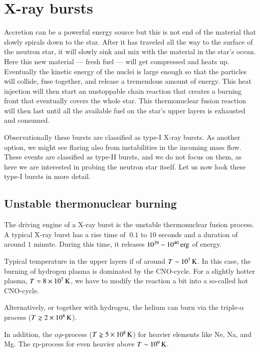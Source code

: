 \section{X-ray bursts}

Accretion can be a powerful energy source but this is not end of the material that slowly spirals down to the star.
After it has traveled all the way to the surface of the neutron star, it will slowly sink and mix with the material in the star's ocean.
Here this new material --- fresh fuel --- will get compressed and heats up.
Eventually the kinetic energy of the nuclei is large enough so that the particles will collide, fuse together, and release a tremendous amount of energy.
This heat injection will then start an unstoppable chain reaction that creates a burning front that eventually covers the whole star.
This thermonuclear fusion reaction will then last until all the available fuel on the star's upper layers is exhausted and consumed.

Observationally these bursts are classified as type-I X-ray bursts.
As another option, we might see flaring also from instabilities in the incoming mass flow. 
These events are classified as type-II bursts, and we do not focus on them, as here we are interested in probing the neutron star itself.
Let us now look these type-I bursts in more detail.



\subsection{Unstable thermonuclear burning}

The driving engine of a X-ray burst is the unstable thermonuclear fusion process.
A typical X-ray burst has a rise time of $~0.1$ to $10$ seconds and a duration of around $1$ minute.
During this time, it releases $10^{39} - 10^{40} \, \mathrm{erg}$ of energy.

\cite{Lewin93}
\cite{SB10}

Typical temperature in the upper layers if of around $T \sim 10^7 \, \mathrm{K}$.
In this case, the burning of hydrogen plasma is dominated by the CNO-cycle.
For a slightly hotter plasma, $T \approx 8 \times 10^{7} \, \mathrm{K}$, we have to modify the reaction a bit into a so-called hot CNO-cycle.\cite{FH65}

Alternatively, or together with hydrogen, the helium can burn via the triple-$\alpha$ process ($T \gnsim 2 \times 10^{8} \, \mathrm{K}$).

In addition, the $\alpha p$-process ($T \gnsim 5 \times 10^{8} \, \mathrm{K}$) for heavier elements like Ne, Na, and Mg.
The rp-process for even heavier above $T \sim 10^9 \, \mathrm{K}$.  
\cite{Fujimoto81, Wallace81, Fisker08}

